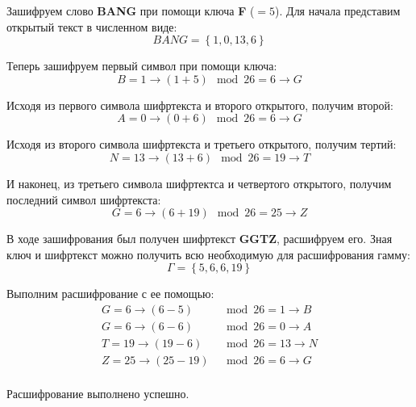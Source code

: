 \documentclass[a4paper]{article}
\begin{document}
  Зашифруем слово \textbf{BANG} при помощи ключа \textbf{F} ($ = 5$). Для начала представим
  открытый текст в численном виде:
  \begin{equation}
    BANG = \left\{1, 0, 13, 6\right\}
  \end{equation}

  Теперь зашифруем первый символ при помощи ключа:
  \begin{equation}
    B = 1 \rightarrow (1 + 5) \mod 26 = 6 \rightarrow G
  \end{equation}

  Исходя из первого символа шифртекста и второго открытого, получим второй:
  \begin{equation}
    A = 0 \rightarrow (0 + 6) \mod 26 = 6 \rightarrow G
  \end{equation}

  Исходя из второго символа шифртекста и третьего открытого, получим тертий:
  \begin{equation}
    N = 13 \rightarrow (13 + 6) \mod 26 = 19 \rightarrow T
  \end{equation}

  И наконец, из третьего символа шифртектса и четвертого открытого, получим последний символ шифртекста:
  \begin{equation}
    G = 6 \rightarrow (6 + 19) \mod 26 = 25 \rightarrow Z
  \end{equation}

  В ходе зашифрования был получен шифртекст \textbf{GGTZ}, расшифруем его.
  Зная ключ и шифртекст можно получить всю необходимую для расшифрования гамму:
  \begin{equation}
    \Gamma = \left\{ 5, 6, 6, 19 \right\}
  \end{equation}

  Выполним расшифрование с ее помощью:
  \begin{equation}
    \begin{aligned}  
      G = 6 \rightarrow (6 - 5) &\mod 26 = 1 \rightarrow B \\ 
      G = 6 \rightarrow (6 - 6) &\mod 26 = 0 \rightarrow A \\ 
      T = 19 \rightarrow (19 - 6) &\mod 26 = 13 \rightarrow N \\ 
      Z = 25 \rightarrow (25 - 19) &\mod 26 = 6 \rightarrow G \\  
    \end{aligned}
  \end{equation}

  Расшифрование выполнено успешно.
\end{document}
